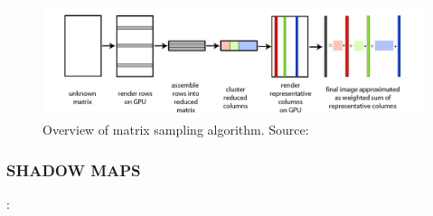 \begin{figure}[h!]
  \centering
    \includegraphics[width=1.0\textwidth]{matrixSampling.jpg}
  \caption{Overview of matrix sampling algorithm. Source: \protect\cite{Havsan2007}}
	\label{fig:matrixSampling}
\end{figure}
\subsubsection{SHADOW MAPS}: 
